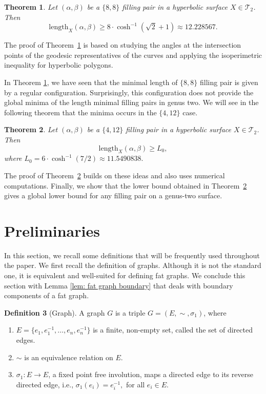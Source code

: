 \documentclass[11pt,reqno]{amsart}
\theoremstyle{plain}
\newtheorem{theorem}{Theorem}[section]
\theoremstyle{definition}
\newtheorem{definition}[theorem]{Definition}
\theoremstyle{remark}
\numberwithin{equation}{section}
\numberwithin{figure}{section}
\begin{document}
\begin{theorem}\label{thm1.3}
    Let $(\alpha, \beta)$ be a $\{8,8\}$ filling pair in a hyperbolic surface $X\in \mathcal{T}_2$. Then
    $$\mathrm{length}_X(\alpha,\beta) \geq 8\cdot\cosh^{-1}\left(\sqrt{2}+1\right)\approx 12.228567.$$ 
\end{theorem}
The proof of Theorem~\ref{thm1.3} is based on studying the angles at the intersection points of the geodesic representatives of the curves and applying the isoperimetric inequality for hyperbolic polygons.

In Theorem \ref{thm1.3}, we have seen that the minimal length of $\{8,8\}$ filling pair is given by a regular configuration. Surprisingly, this configuration does not provide the global minima of the length minimal filling pairs in genus two. We will see in the following theorem that the minima occurs in the $\{4,12\}$ case.
 
 \begin{theorem}\label{thm1.4}
    Let $(\alpha, \beta)$ be a $\{4,12\}$ filling pair in a hyperbolic surface $X\in \mathcal{T}_2$. Then
    $$\mathrm{length}_X(\alpha,\beta) \geq L_0,$$
    where $L_0=6 \cdot \cosh^{-1}(7/2)\approx 11.5490838.$
\end{theorem}

 The proof of Theorem~\ref{thm1.4} builds on these ideas and also uses numerical computations. Finally, we show that the lower bound obtained in Theorem~\ref{thm1.4} gives a global lower bound for any filling pair on a genus-two surface.

\section{Preliminaries}
In this section, we recall some definitions that will be frequently used throughout the paper.
We first recall the definition of graphs. Although it is not the standard one, it is equivalent and well-suited for defining fat graphs. We conclude this section with Lemma \ref{lem: fat graph boundary} that deals with boundary components of a fat graph.
\begin{definition}[Graph]
A graph $G$ is a triple $G=(E,\sim,\sigma_1)$, where
\begin{enumerate}
    \item $E=\{e_1,e_1^{-1},\dots, e_n,e_n^{-1}\}$ is a finite, non-empty set, called the set of directed edges.
    \item $\sim$ is an equivalence relation on $E$.
    \item $\sigma_1:E\to E$, a fixed point free involution, maps a directed edge to its reverse directed edge, i.e., $\sigma_1(e_i)=e_i^{-1},$ for all $e_i\in E$.
\end{enumerate}
\end{definition}
\end{document}
